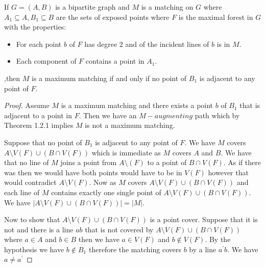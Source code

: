 \documentclass[12pt]{article}
\newenvironment{lemma}[2][Lemma]{\begin{trivlist}
\item[\hskip \labelsep {\bfseries #1}\hskip \labelsep {\bfseries #2.}]}{\end{trivlist}}
\begin{document}
\begin{lemma}
    {1.2.2}
    If $G=(A,B)$ is a bipartite graph and $M$ is a matching on $G$ where
    $A_1\subseteq A,B_1\subseteq B$ are the sets of exposed points where $F$ is the maximal forest in $G$ with the properties:
    \begin{itemize}
        \item For each point $b$ of $F$ has degree $2$ and of the incident lines of $b$ is in $M$.
        \item Each component of $F$ contains a point in $A_1$.
    \end{itemize}
    ,then $M$ is a maximum matching if and only if no point of $B_1$ is adjacent to any point of $F$.

\end{lemma}

\begin{proof}
    Assume $M$ is a maximum matching and there exists a point $b$ of $B_1$ that is adjacent to a point in $F$. Then we have an $M-augmenting$ path which by Theorem 1.2.1 implies $M$ is not a maximum matching.

    Suppose that no point of $B_1$ is adjacent to any point of $F$.
    We have $M$ covers $A\setminus V(F)\cup (B\cap V(F))$ which is immediate as $M$ covers $A$ and $B$. We have that no line of $M$ joins a point from $A\setminus (F)$ to a point of $B\cap V(F)$. As if there was then we would have both points would have to be in $V(F)$ however that would contradict $A\setminus V(F)$. Now as $M$ covers $A\setminus V(F)\cup (B\cap V(F))$ and  each line of $M$ contains exactly one single point of $A\setminus V(F)\cup (B\cap V(F))$. We have $|A\setminus V(F)\cup (B\cap V(F))|=|M|$.

    Now to show that $A\setminus V(F)\cup (B\cap V(F))$ is a point cover. Suppose that it is not and there is a line $ab$ that is not covered by $A\setminus V(F)\cup (B\cap V(F))$ where $a\in A$ and $b\in B$ then we have $a\in V(F)$ and $b\not \in V(F)$. By the hypothesis we have $b\not \in B_1$ therefore the matching covers $b$ by a line $a^\prime b$. We have $a\not = a^\prime$

\end{proof}
\end{document}
